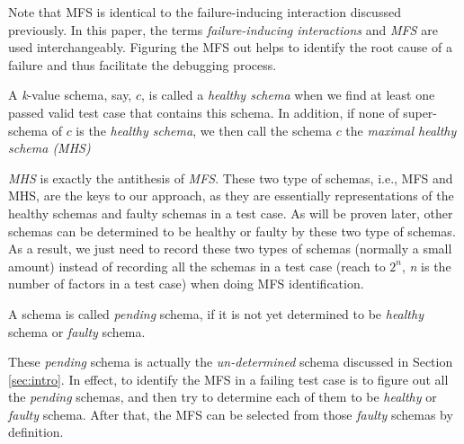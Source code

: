 \documentclass[10pt,journal,cspaper,compsoc]{IEEEtran}
\begin{document}
Note that MFS is identical to the failure-inducing interaction discussed previously. In this paper, the terms \emph{failure-inducing interactions} and \emph{MFS} are used interchangeably. Figuring the MFS out helps to identify the root cause of a failure and thus facilitate the debugging process.

\begin{definition}\label{de:healthy:maximal}
A \emph{k}-value schema, say, $c$, is called a \emph{healthy schema} when we find at least one passed valid test case that contains this schema. In addition, if none of super-schema of $c$ is the \emph{healthy schema}, we then call the schema $c$ the \emph{maximal healthy schema (MHS)}
\end{definition}

\emph{MHS} is exactly the antithesis of \emph{MFS}. These two type of schemas, i.e., MFS and MHS, are the keys to our approach, as they are essentially representations of the healthy schemas and faulty schemas in a test case. As will be proven later, other schemas can be determined to be healthy or faulty by these two type of schemas. As a result, we just need to record these two types of schemas (normally a small amount) instead of recording all the schemas in a test case (reach to $2^{n}$, \emph{n} is the number of factors in a test case) when doing MFS identification.
%

\begin{definition}[Pending]\label{de:pending}
A schema is called \emph{pending} schema, if it is not yet determined to be \emph{healthy} schema or \emph{faulty} schema.
\end{definition}

These \emph{pending} schema is actually the \emph{un-determined} schema discussed in Section \ref{sec:intro}. In effect, to identify the MFS in a failing test case is to figure out all the \emph{pending} schemas, and then try to determine each of them to be \emph{healthy} or \emph{faulty} schema. After that, the MFS can be selected from those \emph{faulty} schemas by definition.

\end{document}
